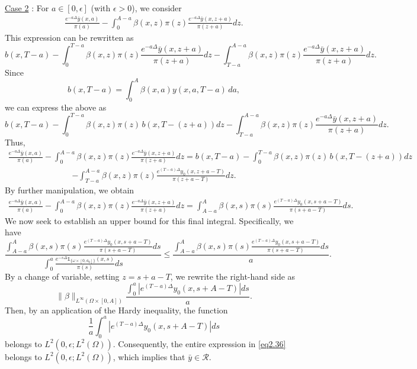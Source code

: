 \documentclass[10pt, a4]{amsart}
\makeatletter
\theoremstyle{plain}
\theoremstyle{definition}
\theoremstyle{remark}
\renewenvironment{proof}[1][\proofname]{\par
  \pushQED{\qed}%
  \normalfont \topsep6\p@\@plus6\p@\relax
  \trivlist
  \item[\hskip\labelsep
        \itshape
    #1\ \ref{#1}.]\ignorespaces
}{%
  \popQED\endtrivlist\@endpefalse
}
\numberwithin{equation}{section}
\makeatother
\begin{document}
\begin{proof}[of Proposition \ref{pr2.5}]
\underline{Case 2} : For \(a \in [0,\epsilon]\) (with \(\epsilon>0\)), we consider  
\begin{align}
    \frac{e^{-a\Delta}\bar{y}(x,a)}{\pi(a)} - \int_{0}^{A-a} \beta(x,z)\pi(z)\frac{e^{-a\Delta}\bar{y}(x,z+a)}{\pi(z+a)}dz.
\end{align}
This expression can be rewritten as  
\[
b(x,T-a) - \int_{0}^{T-a} \beta(x,z)\pi(z)\frac{e^{-a\Delta}\bar{y}(x,z+a)}{\pi(z+a)}dz - \int_{T-a}^{A-a} \beta(x,z)\pi(z)\frac{e^{-a\Delta}\bar{y}(x,z+a)}{\pi(z+a)}dz.
\]
Since  
\[
b(x,T-a) = \int_0^A \beta(x,a) y(x,a,T-a)\,da,
\]
we can express the above as  
\[
b(x,T-a) - \int_{0}^{T-a} \beta(x,z)\pi(z)\,b(x,T-(z+a))dz - \int_{T-a}^{A-a} \beta(x,z)\pi(z)\frac{e^{-a\Delta}\bar{y}(x,z+a)}{\pi(z+a)}dz.
\]
Thus,  
\begin{align}\label{eq2.36}
    \frac{e^{-a\Delta}\bar{y}(x,a)}{\pi(a)} - \int_{0}^{A-a}\beta(x,z)\pi(z)\frac{e^{-a\Delta}\bar{y}(x,z+a)}{\pi(z+a)}dz 
= b(x,T-a) - \int_{0}^{T-a} \beta(x,z)\pi(z)\,b(x,T-(z+a))dz 
\end{align}
\begin{align*}
- \int_{T-a}^{A-a} \beta(x,z)\pi(z)\frac{e^{(T-a)\Delta}y_0(x,z+a-T)}{\pi(z+a-T)}dz.
\end{align*}
By further manipulation, we obtain  
\begin{align}
    \frac{e^{-a\Delta}\bar{y}(x,a)}{\pi(a)} - \int_{0}^{A-a}\beta(x,z)\pi(z)\frac{e^{-a\Delta}\bar{y}(x,z+a)}{\pi(z+a)}dz 
= \int_{A-a}^{A} \beta(x,s)\pi(s)\frac{e^{(T-a)\Delta}y_0(x,s+a-T)}{\pi(s+a-T)}ds.
\end{align}
We now seek to establish an upper bound for this final integral. Specifically, we have
\[
\frac{\displaystyle\int_{A-a}^{A} \beta(x,s)\pi(s)\frac{e^{(T-a)\Delta}y_0(x,s+a-T)}{\pi(s+a-T)}ds}{\displaystyle\int_{0}^{a}\frac{e^{-s\Delta}\mathds{1}_{\{\omega\times[0,a_0]\}}(x,s)}{\pi(s)}ds} \leq \frac{\displaystyle\int_{A-a}^{A} \beta(x,s)\pi(s)\frac{e^{(T-a)\Delta}y_0(x,s+a-T)}{\pi(s+a-T)}ds}{a}.
\]
By a change of variable, setting \(z = s + a - T\), we rewrite the right-hand side as  
\[
\|\beta\|_{L^\infty(\Omega\times[0,A])} \frac{\displaystyle\int_{0}^{a} \left| e^{(T-a)\Delta}y_0(x,s+A-T)\right| ds}{a}.
\]
Then, by an application of the Hardy inequality, the function
\[
\frac{1}{a}\int_{0}^{a} \left| e^{(T-a)\Delta}y_0(x,s+A-T)\right| ds
\]
belongs to \(L^2(0,\epsilon;L^2(\Omega))\). Consequently, the entire expression in \eqref{eq2.36} belongs to \(L^2(0,\epsilon; L^2(\Omega))\), which implies that \(\bar{y}\in \mathcal{R}\).
\end{proof}
\end{document}
